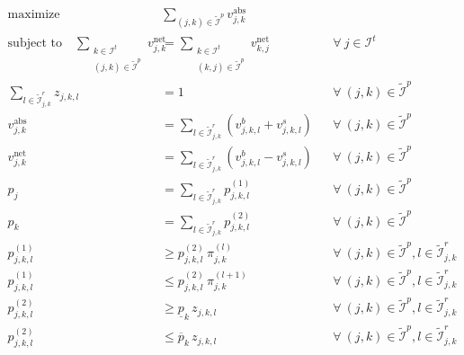 \documentclass[11pt,parskip=full]{scrartcl}%
\newcommand*{\itokens}{\mathcal{I}^t}       %
\newcommand*{\iutokenpairs}{\tilde{\mathcal{I}}^p}   %
\begin{document}
\begin{small}
\begin{subequations}
\begin{align}
  \text{maximize} \quad & \sum\limits_{(j,k) \in \iutokenpairs} v_{j,k}^\mathrm{abs}
  \label{eq:mip3_objective}
  \\[1mm]
  \text{subject to} \quad
  \sum_{\substack{k \in \itokens \\ (j,k) \in \iutokenpairs}} v_{j,k}^\mathrm{net}
  &= \sum_{\substack{k \in \itokens \\ (k,j) \in \iutokenpairs}} v_{k,j}^\mathrm{net}
  && \forall \> j \in \itokens
  \label{eq:mip3_tokenbalance}
  \\[1mm]
  \sum\limits_{l \in \tilde{\mathcal{I}}_{j,k}^r} z_{j,k,l} &= 1
  && \forall \> (j,k) \in \iutokenpairs
  \label{eq:mip3_price_range}
  \\[0mm]
  v_{j,k}^\mathrm{abs}
  &= \sum\limits_{l \in \tilde{\mathcal{I}}_{j,k}^r} \left( v^b_{j,k,l} + v^s_{j,k,l} \right)
  && \forall \> (j,k) \in \iutokenpairs
  \label{eq:mip3_volume_aggr_abs}
  \\[1mm]
  v_{j,k}^\mathrm{net}
  &= \sum\limits_{l \in \tilde{\mathcal{I}}_{j,k}^r} \left( v^b_{j,k,l} - v^s_{j,k,l} \right)
  && \forall \> (j,k) \in \iutokenpairs
  \label{eq:mip3_volume_aggr_net}
  \\[1mm]
  p_j
  &= \sum\limits_{l \in \tilde{\mathcal{I}}_{j,k}^r} p^{(1)}_{j,k,l}
  && \forall \> (j,k) \in \iutokenpairs
  \label{eq:mip3_price1_aggr}
  \\[1mm]
  p_k
  &= \sum\limits_{l \in \tilde{\mathcal{I}}_{j,k}^r} p^{(2)}_{j,k,l}
  && \forall \> (j,k) \in \iutokenpairs
  \label{eq:mip3_price2_aggr}
  \\[1mm]
  p^{(1)}_{j,k,l}
  &\ge p^{(2)}_{j,k,l} \, \pi_{j,k}^{(l)}
  && \forall \> (j,k) \in \iutokenpairs, l \in \tilde{\mathcal{I}}_{j,k}^r
  \label{eq:mip3_price1_lb}
  \\[0mm]
  p^{(1)}_{j,k,l}
  &\le p^{(2)}_{j,k,l} \, \pi_{j,k}^{(l+1)}
  && \forall \> (j,k) \in \iutokenpairs, l \in \tilde{\mathcal{I}}_{j,k}^r
  \label{eq:mip3_price1_ub}
  \\[0mm]
  p^{(2)}_{j,k,l}
  &\ge \underline{p}_k \, z_{j,k,l}
  && \forall \> (j,k) \in \iutokenpairs, l \in \tilde{\mathcal{I}}_{j,k}^r
  \label{eq:mip3_price2_lb}
  \\[0mm]
  p^{(2)}_{j,k,l}
  &\le \overline{p}_k \, z_{j,k,l}
  && \forall \> (j,k) \in \iutokenpairs, l \in \tilde{\mathcal{I}}_{j,k}^r
  \label{eq:mip3_price2_ub}
  \\[1mm]

\end{align}
\end{subequations}
\end{small}
\end{document}
